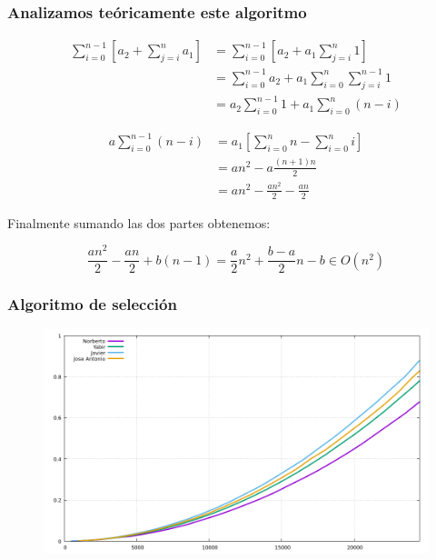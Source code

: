\documentclass[spanish]{beamer}
\begin{document}
\begin{frame}\frametitle{Analizamos teóricamente este algoritmo}
  \begin{equation*}
  \begin{aligned}
    \sum_{i=0}^{n-1}\left[a_2 + \sum_{j=i}^n{a_1}\right] &= \sum_{i=0}^{n-1}\left[a_2+a_1\sum_{j=i}^{n}1\right]  \\
    &= \sum_{i=0}^{n-1}a_2 + a_1 \sum_{i=0}^{n}\sum_{j=i}^{n-1}1 \\
    &= a_2\sum_{i=0}^{n-1}1 + a_1 \sum_{i=0}^{n}(n-i)
  \end{aligned}
\end{equation*}
\end{frame}

\begin{frame}
  \begin{equation*}
  \begin{aligned}
    a\sum_{i=0}^{n-1}(n-i) &= a_1\left[\sum_{i=0}^{n}n - \sum_{i=0}^{n}i\right]  \\
    &= an^2 - a \frac{(n+1)n}{2} \\
    &= an^2- \frac{an^2}{2} - \frac{an}{2}
  \end{aligned}
\end{equation*}
\end{frame}

\begin{frame}
  Finalmente sumando las dos partes obtenemos:

  $$\frac{an^2}{2} - \frac{an}{2}+ b(n-1) = \frac{a}{2}n^2+\frac{b-a}{2}n - b \in O(n^2)$$
\end{frame}

\begin{frame}\frametitle{Algoritmo de selección}
  \begin{figure}[H]
    \centering   
        \includegraphics[clip,width=1\columnwidth]{../plots/seleccion}%
    \end{figure}
  \end{frame}
\end{document}
